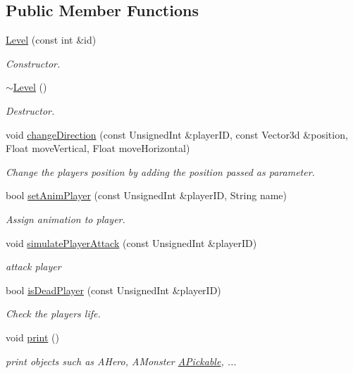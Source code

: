 \subsection*{Public Member Functions}
\begin{DoxyCompactItemize}
\item 
\mbox{\label{classLevel_a1192fe26a12ee85ba164dbc1df4ba8c3}} 
\hyperlink{classLevel_a1192fe26a12ee85ba164dbc1df4ba8c3}{Level} (const int \&id)
\begin{DoxyCompactList}\small\item\em Constructor. \end{DoxyCompactList}\item 
\mbox{\label{classLevel_a249eac1e8f19ff44134efa5e986feaca}} 
\hyperlink{classLevel_a249eac1e8f19ff44134efa5e986feaca}{$\sim$\+Level} ()
\begin{DoxyCompactList}\small\item\em Destructor. \end{DoxyCompactList}\item 
void \hyperlink{classLevel_a7fbf2259277a0be256738886cd82796a}{change\+Direction} (const Unsigned\+Int \&player\+ID, const Vector3d \&position, Float move\+Vertical, Float move\+Horizontal)
\begin{DoxyCompactList}\small\item\em Change the player\textquotesingle{}s position by adding the position passed as parameter. \end{DoxyCompactList}\item 
bool \hyperlink{classLevel_ad3c2dcaeba48a4da763c1b9b6d23d248}{set\+Anim\+Player} (const Unsigned\+Int \&player\+ID, String name)
\begin{DoxyCompactList}\small\item\em Assign animation to player. \end{DoxyCompactList}\item 
void \hyperlink{classLevel_ad31dd05f4278c778da85e79a0fd04430}{simulate\+Player\+Attack} (const Unsigned\+Int \&player\+ID)
\begin{DoxyCompactList}\small\item\em attack player \end{DoxyCompactList}\item 
bool \hyperlink{classLevel_a0ce4503fce6dd9f1a96036a50743d6c6}{is\+Dead\+Player} (const Unsigned\+Int \&player\+ID)
\begin{DoxyCompactList}\small\item\em Check the player\textquotesingle{}s life. \end{DoxyCompactList}\item 
\mbox{\label{classLevel_a5188de55912386ca786cdbe093ca2af4}} 
void \hyperlink{classLevel_a5188de55912386ca786cdbe093ca2af4}{print} ()
\begin{DoxyCompactList}\small\item\em print objects such as A\+Hero, A\+Monster \hyperlink{classAPickable}{A\+Pickable}, ... \end{DoxyCompactList}\end{DoxyCompactItemize}


